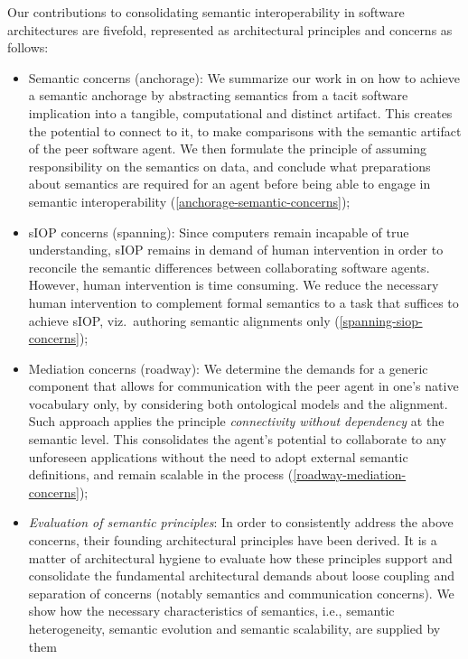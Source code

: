 \documentclass[sort&compress,preprint,authoryear,3p,twocolumn]{elsarticle}
\providecommand{\tightlist}{%
  \setlength{\itemsep}{0pt}\setlength{\parskip}{0pt}}
\begin{document}
Our contributions to consolidating semantic interoperability in software
architectures are fivefold, represented as architectural principles and
concerns as follows:

\begin{itemize}
\tightlist
\item
  Semantic concerns (anchorage): We summarize our work in
  \citep{Brandt2018a} on how to achieve a semantic anchorage by
  abstracting semantics from a tacit software implication into a
  tangible, computational and distinct artifact. This creates the
  potential to connect to it, to make comparisons with the semantic
  artifact of the peer software agent. We then formulate the principle
  of assuming responsibility on the semantics on data, and conclude what
  preparations about semantics are required for an agent before being
  able to engage in semantic interoperability
  (\cref{anchorage-semantic-concerns});
\item
  sIOP concerns (spanning): Since computers remain incapable of true
  understanding, sIOP remains in demand of human intervention in order
  to reconcile the semantic differences between collaborating software
  agents. However, human intervention is time consuming. We reduce the
  necessary human intervention to complement formal semantics to a task
  that suffices to achieve sIOP, viz.~authoring semantic alignments only
  (\cref{spanning-siop-concerns});
\item
  Mediation concerns (roadway): We determine the demands for a generic
  component that allows for communication with the peer agent in one's
  native vocabulary only, by considering both ontological models and the
  alignment. Such approach applies the principle \emph{connectivity
  without dependency} at the semantic level. This consolidates the
  agent's potential to collaborate to any unforeseen applications
  without the need to adopt external semantic definitions, and remain
  scalable in the process (\cref{roadway-mediation-concerns});
\item
  \emph{Evaluation of semantic principles}: In order to consistently
  address the above concerns, their founding architectural principles
  have been derived. It is a matter of architectural hygiene to evaluate
  how these principles support and consolidate the fundamental
  architectural demands about loose coupling and separation of concerns
  (notably semantics and communication concerns). We show how the
  necessary characteristics of semantics, i.e., semantic heterogeneity,
  semantic evolution and semantic scalability, are supplied by them

\end{itemize}
\end{document}
